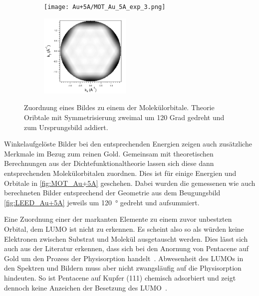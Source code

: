 \begin{figure}
                \begin{subfigure}[t]{0.48\textwidth}
                    \centering
                    \texttt{[image: Au+5A/MOT\_Au\_5A\_exp\_3.png]}
                    \label{fig:MOT_Au+5A_exp_3}
                \end{subfigure}
                \begin{subfigure}[t]{0.48\textwidth}
                    \centering
                    \includegraphics[height=4cm]{Au+5A/HOMO2_all_CT}
                    \label{fig:MOT_Au+5A_theo_3}
                \end{subfigure}
                \caption{Zuordnung eines Bildes zu einem der Molekülorbitale. Theorie Oribtale mit Symmetrisierung zweimal um 120 Grad gedreht und zum Ursprungsbild addiert.}
                \label{fig:MOT_Au+5A}
            \end{figure}
            Winkelaufgelöste Bilder bei den entsprechenden Energien zeigen auch zusätzliche Merkmale im Bezug zum reinen Gold.
            Gemeinsam mit theoretischen Berechnungen aus der Dichtefunktionaltheorie lassen sich diese dann entsprechenden Molekülorbitalen zuordnen.
            Dies ist für einige Energien und Orbitale in \autoref{fig:MOT_Au+5A} geschehen.
            Dabei wurden die gemessenen wie auch berechneten Bilder entsprechend der Geometrie aus dem Beugungsbild \autoref{fig:LEED_Au+5A} jeweils um \SI{120}{\degree} gedreht und aufsummiert.
    
            Eine Zuordnung einer der markanten Elemente zu einem zuvor unbestzten Orbital, dem LUMO ist nicht zu erkennen.
            Es scheint also so als würden keine Elektronen zwischen Substrat und Molekül ausgetauscht werden. 
            Dies lässt sich auch aus der Literatur erkennen, dass sich bei den Anornung von Pentacene auf Gold um den Prozess der Physisorption handelt~\cite{5A_4}.
            Abwesenheit des LUMOs in den Spektren und Bildern muss aber nicht zwangsläufig auf die Physisorption hindeuten.
            So ist Pentacene auf Kupfer (111) chemisch adsorbiert und zeigt dennoch keine Anzeichen der Besetzung des LUMO~\cite{koch_adsorption-induced_2008}.

